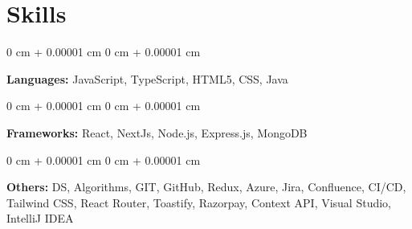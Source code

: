 \documentclass[10pt, letterpaper]{article}
\newenvironment{onecolentry}{
    \begin{adjustwidth}{
        0 cm + 0.00001 cm
    }{
        0 cm + 0.00001 cm
    }
}{
    \end{adjustwidth}
} %
\begin{document}
 
    
    \section{Skills}



        \vspace{0.1 cm}
        \begin{onecolentry}
            \textbf{Languages:} JavaScript, TypeScript, HTML5, CSS, Java \end{onecolentry}

        \vspace{0.2 cm}

        \begin{onecolentry}
            \textbf{Frameworks:} React, NextJs, Node.js, Express.js, MongoDB
        \end{onecolentry}
                \vspace{0.2 cm}

        \begin{onecolentry}
            \textbf{Others:} DS, Algorithms, GIT, GitHub, Redux, Azure, Jira, Confluence, CI/CD, Tailwind CSS, React Router, Toastify, Razorpay, Context API, Visual Studio, IntelliJ IDEA        \end{onecolentry}


    
\end{document}
